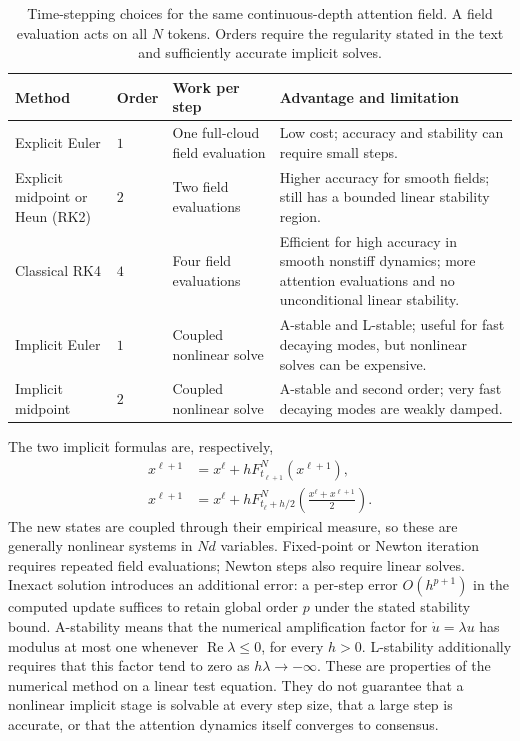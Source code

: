 \documentclass[11pt]{amsart}
\numberwithin{equation}{section}
\theoremstyle{plain}
\begin{document}
\begin{table}[htbp]
\centering
\small
\setlength{\tabcolsep}{4pt}
\renewcommand{\arraystretch}{1.18}
\begin{tabular}{@{}p{}p{}p{}p{}@{}}
\hline
Method & Order & Work per step & Advantage and limitation\\
\hline
Explicit Euler & $1$ & One full-cloud field evaluation
 & Low cost; accuracy and stability can require small steps.\\
Explicit midpoint or Heun (RK2) & $2$ & Two field evaluations
 & Higher accuracy for smooth fields; still has a bounded linear stability region.\\
Classical RK4 & $4$ & Four field evaluations
 & Efficient for high accuracy in smooth nonstiff dynamics; more attention evaluations and no unconditional linear stability.\\
Implicit Euler & $1$ & Coupled nonlinear solve
 & A-stable and L-stable; useful for fast decaying modes, but nonlinear solves can be expensive.\\
Implicit midpoint & $2$ & Coupled nonlinear solve
 & A-stable and second order; very fast decaying modes are weakly damped.\\
\hline
\end{tabular}
\caption{Time-stepping choices for the same continuous-depth attention
field.  A field evaluation acts on all $N$ tokens.  Orders require the
regularity stated in the text and sufficiently accurate implicit solves.}
\label{tab:attention-integrators}
\end{table}


The two implicit formulas are, respectively,
\begin{equation}\label{eq:attention-implicit-methods}
 \begin{aligned}
 x^{\ell+1}&=x^\ell+hF_{t_{\ell+1}}^N(x^{\ell+1}),\\
 x^{\ell+1}&=x^\ell+hF_{t_\ell+h/2}^N
                 \left(\frac{x^\ell+x^{\ell+1}}2\right).
 \end{aligned}
\end{equation}
The new states are coupled through their empirical measure, so these are
generally nonlinear systems in $Nd$ variables.  Fixed-point or Newton
iteration requires repeated field evaluations; Newton steps also require
linear solves.  Inexact solution introduces an additional error: a per-step error
$O(h^{p+1})$ in the computed update suffices to retain global order $p$
under the stated stability bound.  A-stability means that the numerical
amplification factor for $\dot u=\lambda u$ has modulus at most one whenever
$\operatorname{Re}\lambda\leq0$, for every $h>0$.  L-stability additionally
requires that this factor tend to zero as $h\lambda\to-\infty$.
These are properties of the numerical method on a linear test equation.
They do not guarantee that a nonlinear implicit stage is solvable at every
step size, that a large step is accurate, or that the attention dynamics
itself converges to consensus.
\end{document}

